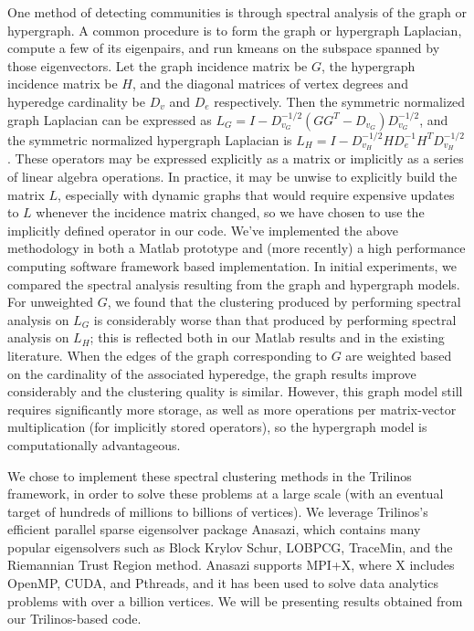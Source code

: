 \documentclass{report}
\begin{document}
One method of detecting communities is through spectral analysis of the
graph or hypergraph. A common procedure is to form the graph or
hypergraph Laplacian, compute a few of its eigenpairs, and run kmeans on
the subspace spanned by those eigenvectors. Let the graph incidence
matrix be $G$, the hypergraph incidence matrix be $H$, and the diagonal
matrices of vertex degrees and hyperedge cardinality be $D_v$ and $D_e$
respectively. Then the symmetric normalized graph Laplacian can be
expressed as
$L_G=I-D_{v_G}^{-1/2}\left(GG^T-D_{v_G}\right)D_{v_G}^{-1/2}$, and the
symmetric normalized hypergraph Laplacian is
$L_H=I-D_{v_H}^{-1/2}HD_e^{-1}H^TD_{v_H}^{-1/2}$. These operators may be
expressed explicitly as a matrix or implicitly as a series of linear algebra
operations. In practice, it may be unwise to explicitly build the matrix $L$,
especially with dynamic graphs that would require expensive updates to $L$
whenever the incidence matrix changed, so we have chosen to use the
implicitly defined operator in our code. We've implemented the above
methodology in both a Matlab prototype and (more recently) a high
performance computing software framework based implementation. In initial
experiments, we compared the spectral analysis resulting from the graph
and hypergraph models. For unweighted $G$, we found that the clustering
produced by performing spectral analysis on $L_G$ is considerably worse
than
that produced by performing spectral analysis on $L_H$; this is reflected both
in our Matlab results and in the existing literature. When the edges of
the graph corresponding to $G$ are weighted based on the cardinality of the
associated hyperedge, the graph results improve considerably and the
clustering quality is similar. However, this graph model still requires
significantly more storage, as well as more operations per matrix-vector
multiplication (for implicitly stored operators), so the hypergraph model
is computationally advantageous.

We chose to implement these spectral clustering methods in the Trilinos
framework, in order to solve these problems at a large scale (with an
eventual target of hundreds of millions to billions of vertices). We
leverage Trilinos's efficient parallel sparse eigensolver package
Anasazi, which contains many popular eigensolvers such as Block Krylov
Schur, LOBPCG, TraceMin, and the Riemannian Trust Region method. Anasazi
supports MPI+X, where X includes OpenMP, CUDA, and Pthreads, and it has
been used to solve data
analytics problems with over a billion vertices. We will be presenting results
obtained from our Trilinos-based code.
\end{document}
